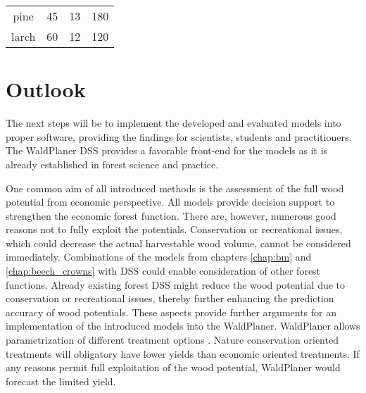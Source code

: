 \begin{table}[h]
\begin{tabular}{cccc}
		pine        & 45                                                                 & 13                                                                                  & 180                                                                                \\
		larch        & 60                                                                 & 12                                                                                  & 120                                                                                \\ \hline
	\end{tabular}
\end{table}





\section{Outlook}
\label{sec:discussion:outlook}
The next steps will be to implement the developed and evaluated models into proper software, providing the findings for scientists, students and practitioners. The WaldPlaner DSS provides a favorable front-end for the models as it is already established in forest science and practice.

One common aim of all introduced methods is the assessment of the full wood potential from economic perspective. All models provide decision support to strengthen the economic forest function. There are, however, numerous good reasons not to fully exploit the potentials. Conservation or recreational issues, which could decrease the actual harvestable wood volume, cannot be considered immediately. Combinations of the models from chapters \ref{chap:bm} and \ref{chap:beech_crowns} with DSS could enable consideration of other forest functions. Already existing forest DSS might reduce the wood potential due to conservation or recreational issues, thereby further enhancing the prediction accuracy of wood potentials. These aspects provide further arguments for an implementation of the introduced models into the WaldPlaner. WaldPlaner allows parametrization of different treatment options \citep[p. 90-93]{hansen_2014}. Nature conservation oriented treatments will obligatory have lower yields than economic oriented treatments. If any reasons permit full exploitation of the wood potential, WaldPlaner would forecast the limited yield.

